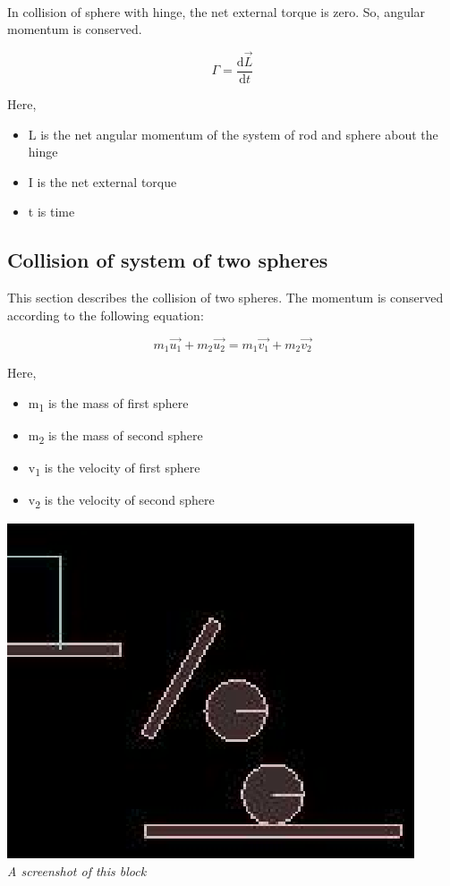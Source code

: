 \documentclass[11pt]{article}
\begin{document}
\paragraph{}
In collision of sphere with hinge, the net external torque is zero. So, angular momentum is conserved.

\begin{equation}
		\Gamma =  \frac{\mathrm{d} \vec{L}}{\mathrm{d}t}
\end{equation}

Here, 	
\begin{itemize}
\item L is the net angular momentum of the system of rod and sphere about the hinge
\item I is the net external torque
\item t is time
\end{itemize}


\subsection{Collision of system of two spheres}

This section describes the collision of two spheres. The momentum is conserved according to the following equation:

\begin{equation}
		m_1\vec{u_1} + m_2\vec{u_2} = m_1\vec{v_1} + m_2\vec{v_2}
\end{equation}

Here, 	
\begin{itemize}
\item m\textsubscript{1} is the mass of first sphere
\item m\textsubscript{2} is the mass of second sphere
\item v\textsubscript{1} is the velocity of first sphere
\item v\textsubscript{2} is the velocity of second sphere
\end{itemize}

\begin{center}
  \includegraphics[scale = 1]{ob2} \\
  \emph{A screenshot of this block} \\
\end{center}
\end{document}
